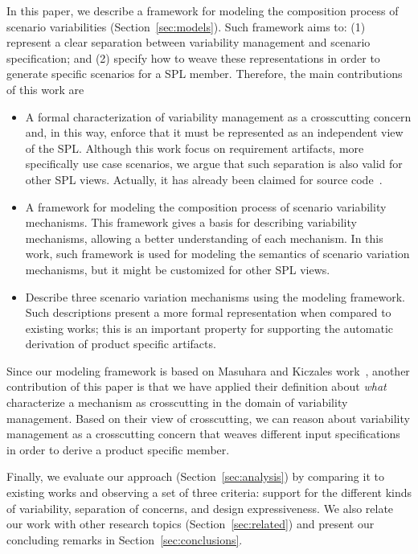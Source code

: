 \documentclass{acm_proc_article-sp}
\begin{document}
In this paper, we describe a framework for modeling the composition 
process of scenario variabilities (Section~\ref{sec:models}). 
Such framework aims to: (1) represent a clear separation between variability management 
and scenario specification; and (2) specify how to weave these representations in order to generate
specific scenarios for a SPL member. Therefore, the main contributions of this work are

\begin{itemize}

\item A formal characterization of variability management as a crosscutting concern and, in this way, enforce that it  
must be represented as an independent view of the SPL. Although this work focus on requirement artifacts, 
more specifically use case scenarios, we argue that such separation is also valid for other SPL views. Actually,
it has already been claimed for source code~\cite{alves-gpce-06,mmedeiros-lawasp-2007}.
  
\item A framework for modeling the composition process of scenario variability mechanisms. 
This framework gives a basis for describing variability mechanisms, 
allowing a better understanding of each mechanism. In this work, such framework is used for modeling 
the semantics of scenario variation mechanisms, but it might be customized for other SPL views.

\item Describe three scenario variation mechanisms using the
modeling framework. Such descriptions present
a more formal representation when compared to existing works; this is an
important property for supporting the automatic derivation of product
specific artifacts.

\end{itemize}

Since our modeling framework is based on Masuhara and Kiczales work~\cite{kiczales-ecoop-2003}, another 
contribution of this paper is that we have applied their definition about \emph{what} characterize a mechanism as crosscutting in the domain of variability management. Based on their view of crosscutting, we can reason about variability management as a crosscutting concern that weaves different input specifications in order to derive a product specific member. 

Finally, we evaluate our approach (Section~\ref{sec:analysis}) by comparing it 
to existing works and observing a set of three criteria: support for the 
different kinds of variability, separation of concerns, and design expressiveness.  We 
also relate our work with other research topics (Section~\ref{sec:related}) and present our concluding 
remarks in Section~\ref{sec:conclusions}.
\end{document}
